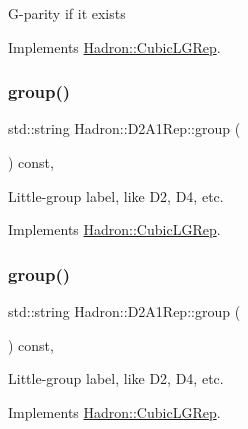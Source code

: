 G-\/parity if it exists 

Implements \mbox{\hyperlink{structHadron_1_1CubicLGRep_ace26f7b2d55e3a668a14cb9026da5231}{Hadron\+::\+Cubic\+L\+G\+Rep}}.

\mbox{\label{structHadron_1_1D2A1Rep_a6762c80fbf9ea0761e63a9ad4711ed39}} 
\subsubsection{\texorpdfstring{group()}{group()}\hspace{0.1cm}{\footnotesize\ttfamily [1/5]}}
{\footnotesize\ttfamily std\+::string Hadron\+::\+D2\+A1\+Rep\+::group (\begin{DoxyParamCaption}{ }\end{DoxyParamCaption}) const\hspace{0.3cm}{\ttfamily [inline]}, {\ttfamily [virtual]}}

Little-\/group label, like D2, D4, etc. 

Implements \mbox{\hyperlink{structHadron_1_1CubicLGRep_a9bdb14b519a611d21379ed96a3a9eb41}{Hadron\+::\+Cubic\+L\+G\+Rep}}.

\mbox{\label{structHadron_1_1D2A1Rep_a6762c80fbf9ea0761e63a9ad4711ed39}} 
\subsubsection{\texorpdfstring{group()}{group()}\hspace{0.1cm}{\footnotesize\ttfamily [2/5]}}
{\footnotesize\ttfamily std\+::string Hadron\+::\+D2\+A1\+Rep\+::group (\begin{DoxyParamCaption}{ }\end{DoxyParamCaption}) const\hspace{0.3cm}{\ttfamily [inline]}, {\ttfamily [virtual]}}

Little-\/group label, like D2, D4, etc. 

Implements \mbox{\hyperlink{structHadron_1_1CubicLGRep_a9bdb14b519a611d21379ed96a3a9eb41}{Hadron\+::\+Cubic\+L\+G\+Rep}}.

\mbox{\label{structHadron_1_1D2A1Rep_a6762c80fbf9ea0761e63a9ad4711ed39}} 
